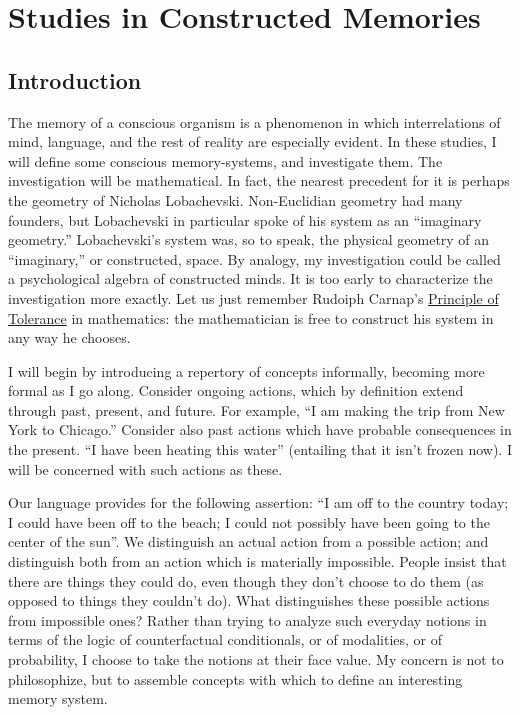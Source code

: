 \chapter{Studies in Constructed Memories}
\pagestyle{salpc}
\setheadrule{0.4pt}

\section{Introduction}

The memory of a conscious organism is a phenomenon in which 
interrelations of mind, language, and the rest of reality are especially evident. 
In these studies, I will define some conscious memory-systems, and 
investigate them. The investigation will be mathematical. In fact, the nearest 
precedent for it is perhaps the geometry of Nicholas Lobachevski. 
Non-Euclidian geometry had many founders, but Lobachevski in particular 
spoke of his system as an \enquote{imaginary geometry.} Lobachevski's system was, 
so to speak, the physical geometry of an \enquote{imaginary,} or constructed, space. 
By analogy, my investigation could be called a psychological algebra of 
constructed minds. It is too early to characterize the investigation more 
exactly. Let us just remember Rudoiph Carnap's \uline{Principle of Tolerance} in 
mathematics: the mathematician is free to construct his system in any way 
he chooses. 

I will begin by introducing a repertory of concepts informally, becoming more formal as I go along. Consider ongoing actions, which by definition extend through past, present, and future. For example, \enquote{I am making the trip from New York to Chicago.} Consider also past actions which have probable consequences in the present. \enquote{I have been heating this water} (entailing that it isn't frozen now). I will be concerned with such actions as these. 

Our language provides for the following assertion: \enquote{I am off to the country today; I could have been off to the beach; I could not possibly have been going to the center of the sun}. We distinguish an actual action from a possible action; and distinguish both from an action which is materially impossible. People insist that there are things they could do, even though they don't choose to do them (as opposed to things they couldn't do). What distinguishes these possible actions from impossible ones? Rather than trying to analyze such everyday notions in terms of the logic of counterfactual conditionals, or of modalities, or of probability, I choose to take the notions at their face value. My concern is not to philosophize, but to assemble concepts with which to define an interesting memory system. 

